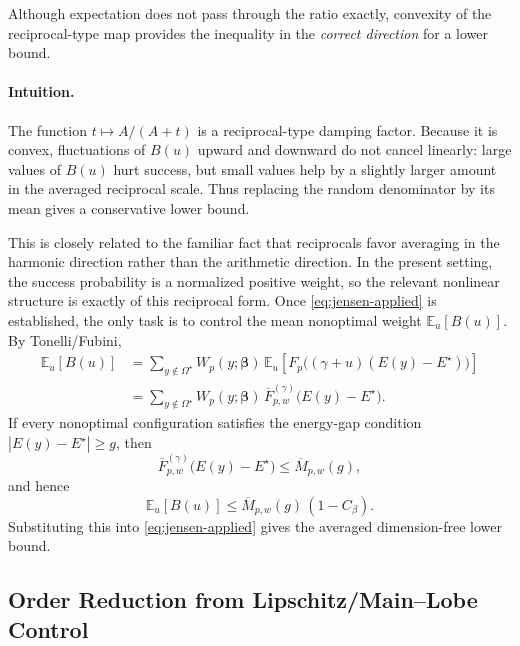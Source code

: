 \documentclass[a4paper,unpublished,onecolumn,11pt]{quantumarticle}
\theoremstyle{definition}
\theoremstyle{remark}
\begin{document}
Although expectation does not pass through the ratio exactly, convexity of the reciprocal-type map provides the inequality in the
\emph{correct direction} for a lower bound.

\paragraph{Intuition.}
The function $t\mapsto A/(A+t)$ is a reciprocal-type damping factor. Because it is convex, fluctuations of $B(u)$ upward and downward do not cancel linearly: large values of $B(u)$ hurt success, but small values help by a slightly larger amount in the averaged reciprocal scale. Thus replacing the random denominator by its mean gives a conservative lower bound.

This is closely related to the familiar fact that reciprocals favor averaging in
the harmonic direction rather than the arithmetic direction. In the present
setting, the success probability is a normalized positive weight, so the
relevant nonlinear structure is exactly of this reciprocal form. Once \eqref{eq:jensen-applied} is established, the only task is to control the
mean nonoptimal weight $\mathbb E_u[B(u)]$. By Tonelli/Fubini,
\begin{align}
\label{eq:jensen-tonelli-step}
\mathbb E_u[B(u)]
&=
\sum_{y\notin\Omega^\star}
W_p(y;\boldsymbol\beta)\,
\mathbb E_u\!\left[
F_p\!\bigl((\gamma+u)(E(y)-E^\star)\bigr)
\right]
\nonumber\\
&=
\sum_{y\notin\Omega^\star}
W_p(y;\boldsymbol\beta)\,
\overline F_{p,w}^{(\gamma)}\!\bigl(E(y)-E^\star\bigr).
\end{align}
If every nonoptimal configuration satisfies the energy-gap condition
$|E(y)-E^\star|\ge g$, then
\[
\overline F_{p,w}^{(\gamma)}\!\bigl(E(y)-E^\star\bigr)
\le
\overline M_{p,w}(g),
\]
and hence
\begin{equation}
\label{eq:jensen-final-B-bound}
\mathbb E_u[B(u)]
\le
\overline M_{p,w}(g)\,(1-C_\beta).
\end{equation}
Substituting this into \eqref{eq:jensen-applied} gives the averaged dimension-free lower bound.





\subsection{Order Reduction from Lipschitz/Main--Lobe Control}
\label{sec:depth-reduction}
\end{document}
